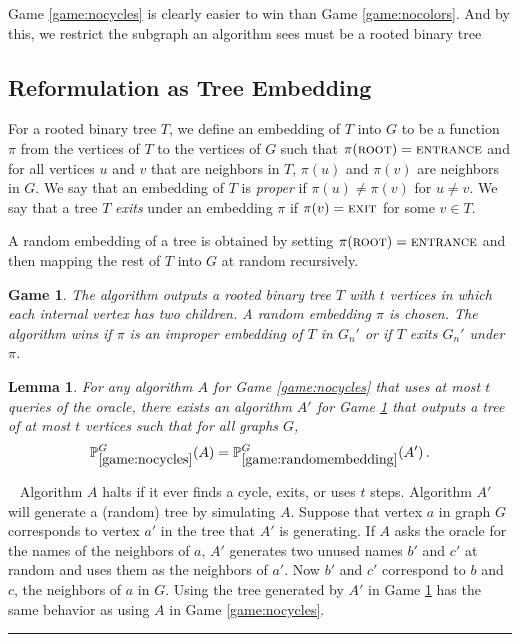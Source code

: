 \documentclass[aps,11pt,twoside,nofootinbib,tightenlines,superscriptaddress,preprintnumbers]{revtex4}
\newcommand{\<}{\langle}
\renewcommand{\>}{\rangle}
\newcommand{\be}{\begin{equation}}
\newcommand{\ee}{\end{equation}}
\newcommand{\ent}{{\textsc{entrance}}}
\newcommand{\exit}{{\textsc{exit}}}
\renewcommand{\root}{{\textsc{root}}}
\newtheorem{lemma}[theorem]{Lemma}
\newtheorem{game}{Game}
\newcommand{\qed}{\rule{7pt}{7pt}}
\newenvironment{proof}
  {\trivlist\item\noindent{\bf Proof}~}
  {\qed\endtrivlist}
\newenvironment{proof sketch}
{\trivlist\item\noindent{\bf Proof sketch}~}
{\qed\endtrivlist}
\begin{document}
Game \ref{game:nocycles} is clearly easier to win than Game \ref{game:nocolors}. And by this, we restrict the subgraph an algorithm sees must be a rooted binary tree

\subsection{Reformulation as Tree Embedding}

For a rooted binary tree $T$, we define an embedding of $T$ into $G$ to be a function $\pi$ from the vertices of $T$ to the vertices of $G$ such that $\pi(\root) = \ent$ and for all vertices $u$ and $v$ that are neighbors in $T$, $\pi(u)$ and $\pi(v)$ are neighbors in $G$.  We say that an embedding of $T$ is {\em proper} if $\pi(u) \not = \pi(v)$ for $u \ne v$.  We say that a tree $T$ {\em exits} under an embedding $\pi$ if $\pi(v) = \exit$ for some $v \in T$.

 A random embedding of a tree is obtained by setting $\pi(\root) = \ent$ and then mapping the rest of $T$ into $G$ at random recursively.


\begin{game}\label{game:randomembedding}
  The algorithm outputs a rooted binary tree $T$ with $t$ vertices in
  which each internal vertex has two children.  A random embedding $\pi$ is chosen.
  The algorithm wins if $\pi$ is an improper embedding of $T$ in $G_n'$ or if $T$ exits $G_n'$ under $\pi$.
\end{game}


\begin{lemma}\label{lem:equivalence}
For any algorithm $A$ for Game \ref{game:nocycles} that uses at most $t$
queries of the oracle, there exists an algorithm $A'$ for Game
\ref{game:randomembedding} that outputs a tree of at most $t$ vertices
such that for all graphs $G$,
\be
    \mathbb{P}^{G}_{\ref{game:nocycles}}(A) 
  = \mathbb{P}^{G}_{\ref{game:randomembedding}}(A')
\,.
\ee
\end{lemma}

\begin{proof}
Algorithm $A$ halts if it ever finds a cycle, exits, or uses $t$ steps.
Algorithm $A'$ will generate a (random) tree by simulating $A$.  Suppose
that vertex $a$ in graph $G$ corresponds to vertex $a'$ in the tree that
$A'$ is generating.  If $A$ asks the oracle for the names of the neighbors
of $a$, $A'$ generates two unused names $b'$ and $c'$ at random and uses
them as the neighbors of $a'$.  Now $b'$ and $c'$ correspond to $b$ and
$c$, the neighbors of $a$ in $G$.  Using the tree generated by $A'$ in
Game \ref{game:randomembedding} has the same behavior as using $A$ in Game
\ref{game:nocycles}.
\end{proof}
\end{document}
